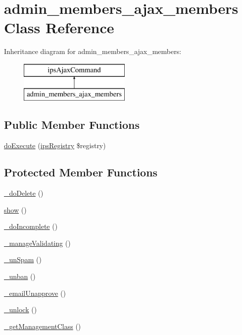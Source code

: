 \hypertarget{classadmin__members__ajax__members}{\section{admin\-\_\-members\-\_\-ajax\-\_\-members Class Reference}
\label{classadmin__members__ajax__members}
}
Inheritance diagram for admin\-\_\-members\-\_\-ajax\-\_\-members\-:\begin{figure}[H]
\begin{center}
\leavevmode
\includegraphics[height=2.000000cm]{classadmin__members__ajax__members}
\end{center}
\end{figure}
\subsection*{Public Member Functions}
\begin{DoxyCompactItemize}
\item 
\hyperlink{classadmin__members__ajax__members_afbc4e912a0604b94d47d66744c64d8ba}{do\-Execute} (\hyperlink{classips_registry}{ips\-Registry} \$registry)
\end{DoxyCompactItemize}
\subsection*{Protected Member Functions}
\begin{DoxyCompactItemize}
\item 
\hyperlink{classadmin__members__ajax__members_a706bbcf35b4965482866a0fb2f370d53}{\-\_\-do\-Delete} ()
\item 
\hyperlink{classadmin__members__ajax__members_a2b8e3779f5bd8c38f70307574859bd36}{show} ()
\item 
\hyperlink{classadmin__members__ajax__members_ab89c5067b1466f41af5d031626d14db2}{\-\_\-do\-Incomplete} ()
\item 
\hyperlink{classadmin__members__ajax__members_ae49e7a2cff54b76aa50bd602752041ef}{\-\_\-manage\-Validating} ()
\item 
\hyperlink{classadmin__members__ajax__members_a79d7c6555e7f46e23e5f4cc370c91982}{\-\_\-un\-Spam} ()
\item 
\hyperlink{classadmin__members__ajax__members_a4ad5348c497be295ee4dc59f5f022117}{\-\_\-unban} ()
\item 
\hyperlink{classadmin__members__ajax__members_a3ba21359fd8f70aad66bff460282f883}{\-\_\-email\-Unapprove} ()
\item 
\hyperlink{classadmin__members__ajax__members_a0ed6d9e80c19ee7d330e07f04881ede3}{\-\_\-unlock} ()
\item 
\hyperlink{classadmin__members__ajax__members_a8322230ea8607d989326e39cde8999fc}{\-\_\-get\-Management\-Class} ()
\end{DoxyCompactItemize}
